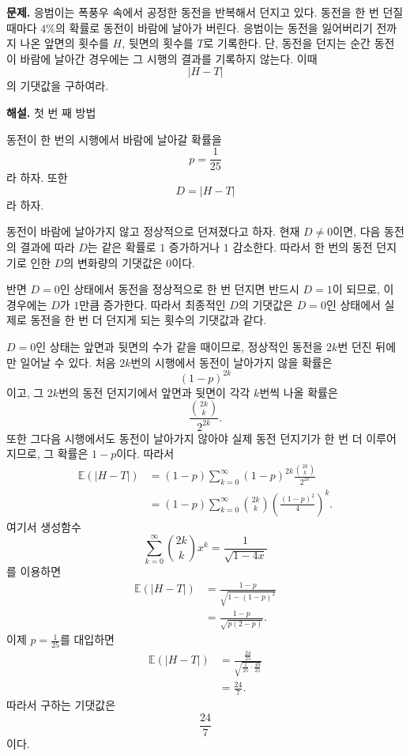 \documentclass{article}
\begin{document}
\noindent\textbf{문제.} 응범이는 폭풍우 속에서 공정한 동전을 반복해서 던지고 있다. 동전을 한 번 던질 때마다 \(4\%\)의 확률로 동전이 바람에 날아가 버린다. 응범이는 동전을 잃어버리기 전까지 나온 앞면의 횟수를 \(H\), 뒷면의 횟수를 \(T\)로 기록한다. 단, 동전을 던지는 순간 동전이 바람에 날아간 경우에는 그 시행의 결과를 기록하지 않는다. 이때
\[ |H-T| \]
의 기댓값을 구하여라.

\noindent\textbf{해설.}
첫 번 째 방법

동전이 한 번의 시행에서 바람에 날아갈 확률을
\[ p=\frac{1}{25} \]
라 하자. 또한
\[ D=|H-T| \]
라 하자.

동전이 바람에 날아가지 않고 정상적으로 던져졌다고 하자. 현재 \(D\neq 0\)이면, 다음 동전의 결과에 따라 \(D\)는 같은 확률로 \(1\) 증가하거나 \(1\) 감소한다. 따라서 한 번의 동전 던지기로 인한 \(D\)의 변화량의 기댓값은 \(0\)이다.

반면 \(D=0\)인 상태에서 동전을 정상적으로 한 번 던지면 반드시 \(D=1\)이 되므로, 이 경우에는 \(D\)가 \(1\)만큼 증가한다. 따라서 최종적인 \(D\)의 기댓값은 \(D=0\)인 상태에서 실제로 동전을 한 번 더 던지게 되는 횟수의 기댓값과 같다.

\(D=0\)인 상태는 앞면과 뒷면의 수가 같을 때이므로, 정상적인 동전을 \(2k\)번 던진 뒤에만 일어날 수 있다. 처음 \(2k\)번의 시행에서 동전이 날아가지 않을 확률은
\[ (1-p)^{2k} \]
이고, 그 \(2k\)번의 동전 던지기에서 앞면과 뒷면이 각각 \(k\)번씩 나올 확률은
\[ \frac{\binom{2k}{k}}{2^{2k}}. \]
또한 그다음 시행에서도 동전이 날아가지 않아야 실제 동전 던지기가 한 번 더 이루어지므로, 그 확률은 \(1-p\)이다. 따라서
\[
\begin{aligned}
\mathbb{E}(|H-T|)
&=(1-p)\sum_{k=0}^{\infty} (1-p)^{2k}\frac{\binom{2k}{k}}{2^{2k}}\\
&=(1-p)\sum_{k=0}^{\infty} \binom{2k}{k} \left(\frac{(1-p)^2}{4}\right)^k.
\end{aligned}
\]
여기서 생성함수
\[ \sum_{k=0}^{\infty}\binom{2k}{k}x^k =\frac{1}{\sqrt{1-4x}} \]
를 이용하면
\[
\begin{aligned}
\mathbb{E}(|H-T|)
&=\frac{1-p}{\sqrt{1-(1-p)^2}}\\
&=\frac{1-p}{\sqrt{p(2-p)}}.
\end{aligned}
\]
이제 \(p=\frac{1}{25}\)를 대입하면
\[
\begin{aligned}
\mathbb{E}(|H-T|)
&=\frac{\frac{24}{25}} {\sqrt{\frac{1}{25}\cdot\frac{49}{25}}}\\
&=\frac{24}{7}.
\end{aligned}
\]
따라서 구하는 기댓값은
\[ \boxed{\frac{24}{7}} \]
이다.
\end{document}
